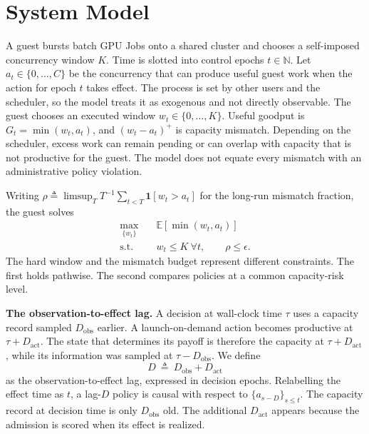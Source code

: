 \section{System Model}
\label{sec:model}

A guest bursts batch GPU Jobs onto a shared cluster and chooses a self-imposed
concurrency window $K$. Time is slotted into control epochs $t\in\mathbb{N}$. Let
$a_t\in\{0,\dots,C\}$ be the concurrency that can produce useful guest work when
the action for epoch $t$ takes effect. The process is set by other users and the
scheduler, so the model treats it as exogenous and not directly observable. The
guest chooses an executed window $w_t\in\{0,\dots,K\}$. Useful goodput is
$G_t=\min(w_t,a_t)$, and $(w_t-a_t)^+$ is capacity mismatch. Depending on the
scheduler, excess work can remain pending or can overlap with capacity that is
not productive for the guest. The model does not equate every mismatch with an
administrative policy violation.

Writing
$\rho\triangleq\limsup_T T^{-1}\sum_{t<T}\mathbf 1[w_t>a_t]$ for the long-run
mismatch fraction, the guest solves
\begin{equation}\label{eq:polite}
\begin{aligned}
\max_{\{w_t\}}\quad & \mathbb{E}[\min(w_t,a_t)] \\
\text{s.t.}\quad & w_t\le K\ \forall t,\qquad \rho\le\epsilon .
\end{aligned}
\end{equation}
The hard window and the mismatch budget represent different constraints. The
first holds pathwise. The second compares policies at a common capacity-risk
level.

\noindent\textbf{The observation-to-effect lag.}
A decision at wall-clock time $\tau$ uses a capacity record sampled
$D_{\mathrm{obs}}$ earlier. A launch-on-demand action becomes productive at
$\tau+D_{\mathrm{act}}$. The state that determines its payoff is therefore the
capacity at $\tau+D_{\mathrm{act}}$, while its information was sampled at
$\tau-D_{\mathrm{obs}}$. We define
\begin{equation}\label{eq:Ddef}
D\ \triangleq\ D_{\mathrm{obs}}+D_{\mathrm{act}}
\end{equation}
as the observation-to-effect lag, expressed in decision epochs. Relabelling the
effect time as $t$, a lag-$D$ policy is causal with respect to
$\{a_{s-D}\}_{s\le t}$. The capacity record at decision time is only
$D_{\mathrm{obs}}$ old. The additional $D_{\mathrm{act}}$ appears because the
admission is scored when its effect is realized.

